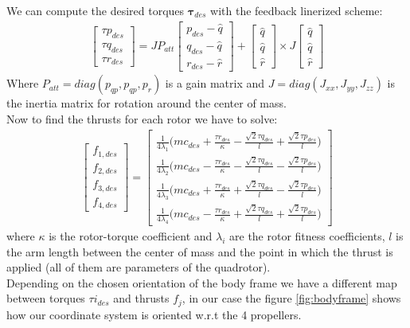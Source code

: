 We can compute the desired torques $\boldsymbol{\tau}_{des}$ with the feedback linerized scheme:
\begin{align}
\begin{bmatrix}
\tau p_{des}  \\[10pt]
\tau q_{des}  \\[10pt]
\tau r_{des}
\end{bmatrix} 
= JP_{att}
\begin{bmatrix}
p_{des} - \hat{q} \\[10pt]
q_{des} - \hat{q}  \\[10pt]
r_{des} - \hat{r}
\end{bmatrix} + 
\begin{bmatrix}
\hat{q} \\[10pt]
\hat{q}  \\[10pt]
\hat{r}
\end{bmatrix}
\times
J
\begin{bmatrix}
\hat{q} \\[10pt]
\hat{q} \\[10pt]
\hat{r}
\end{bmatrix}
\label{eq:torques}
\end{align}
Where $P_{att} = diag(p_{qp} ,p_{qp} ,p_{r} )$ is a gain matrix and  $J = diag(J_{xx} ,J_{yy} ,J_{zz} )$ is the inertia matrix for rotation around the center of mass.\\
Now to find the thrusts for each rotor we have to solve:
\begin{align}
\begin{bmatrix}
f_{1,des}  \\[10pt]
f_{2,des}  \\[10pt]
f_{3,des}  \\[10pt]
f_{4,des}  
\end{bmatrix} 
=
\begin{bmatrix}
\frac{1}{4\lambda_1} \big(m c_{des} + \frac{\tau r_{des}}{\kappa} - \frac{\sqrt{2}\tau q_{des}}{l} + \frac{\sqrt{2}\tau p_{des}}{l}\big) \\[10pt]
\frac{1}{4\lambda_2} \big(m c_{des} - \frac{\tau r_{des}}{\kappa} - \frac{\sqrt{2}\tau q_{des}}{l} - \frac{\sqrt{2}\tau p_{des}}{l}\big) \\[10pt]
\frac{1}{4\lambda_3} \big(m c_{des} + \frac{\tau r_{des}}{\kappa} + \frac{\sqrt{2}\tau q_{des}}{l} - \frac{\sqrt{2}\tau p_{des}}{l}\big)\\[10pt]
\frac{1}{4\lambda_4} \big(m c_{des} - \frac{\tau r_{des}}{\kappa} + \frac{\sqrt{2}\tau q_{des}}{l} + \frac{\sqrt{2}\tau p_{des}}{l}\big)
\end{bmatrix} 
\label{eq:thrusts}
\end{align}
where $\kappa$ is the rotor-torque coefficient and $\lambda_i$ are the rotor fitness coefficients, $l$ is the arm length between the center of mass and the point in which the thrust is applied (all of them are parameters of the quadrotor). \\
Depending on the chosen orientation of the body frame we have a different map between torques $\tau i_{des}$ and thrusts $f_j$, in our case the figure \ref{fig:bodyframe} shows how our coordinate system is oriented w.r.t the 4 propellers.

